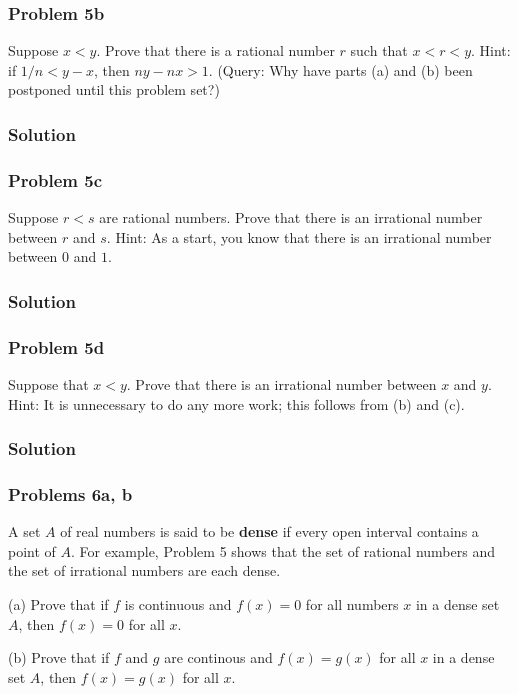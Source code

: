 \subsubsection*{Problem 5b}
Suppose $x<y$. Prove that there is a rational number $r$ such that
$x<r<y$. Hint: if $1/n<y-x$, then $ny-nx>1$. (Query: Why have parts
(a) and (b) been postponed until this problem set?)

\subsubsection*{Solution}

\subsubsection*{Problem 5c}
Suppose $r<s$ are rational numbers. Prove that there is an irrational
number between $r$ and $s$. Hint: As a start, you know that there is
an irrational number between $0$ and $1$.

\subsubsection*{Solution}

\subsubsection*{Problem 5d}
Suppose that $x<y$. Prove that there is an irrational number between
$x$ and $y$. Hint: It is unnecessary to do any more work; this follows
from (b) and (c).

\subsubsection*{Solution}

\subsubsection*{Problems 6a, b}
A set $A$ of real numbers is said to be \textbf{dense} if every open
interval contains a point of $A$. For example, Problem 5 shows that
the set of rational numbers and the set of irrational numbers are each
dense.

\vs

(a) Prove that if $f$ is continuous and $f(x)=0$ for all numbers $x$
in a dense set $A$, then $f(x)=0$ for all $x$.

\vs

(b) Prove that if $f$ and $g$ are continous and $f(x)=g(x)$ for all
$x$ in a dense set $A$, then $f(x)=g(x)$ for all $x$.

